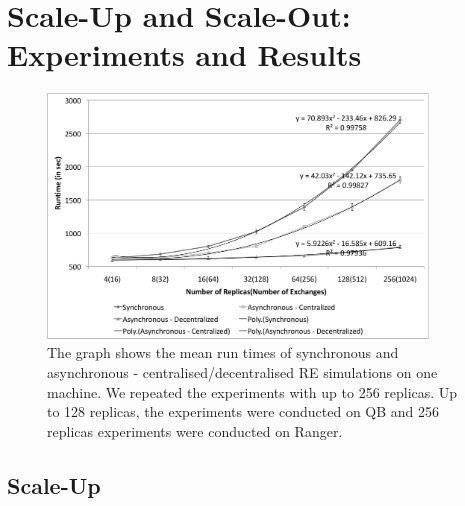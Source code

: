\documentclass{rspublic}
\begin{document}
\section{Scale-Up and Scale-Out: Experiments and Results}

%
\begin{figure}
\centering
\includegraphics[width=0.9\textwidth]{../data/scale_up.pdf}
\caption{\small The graph shows the mean run times of synchronous and asynchronous - centralised/decentralised RE simulations on one machine. We repeated the experiments with up to 256 replicas. Up to 128 replicas, the experiments were conducted on QB and 256 replicas experiments were conducted on Ranger.}
\label{fig:graph}
\vspace{-1em}
\end{figure}



\subsection{Scale-Up}
\end{document}
